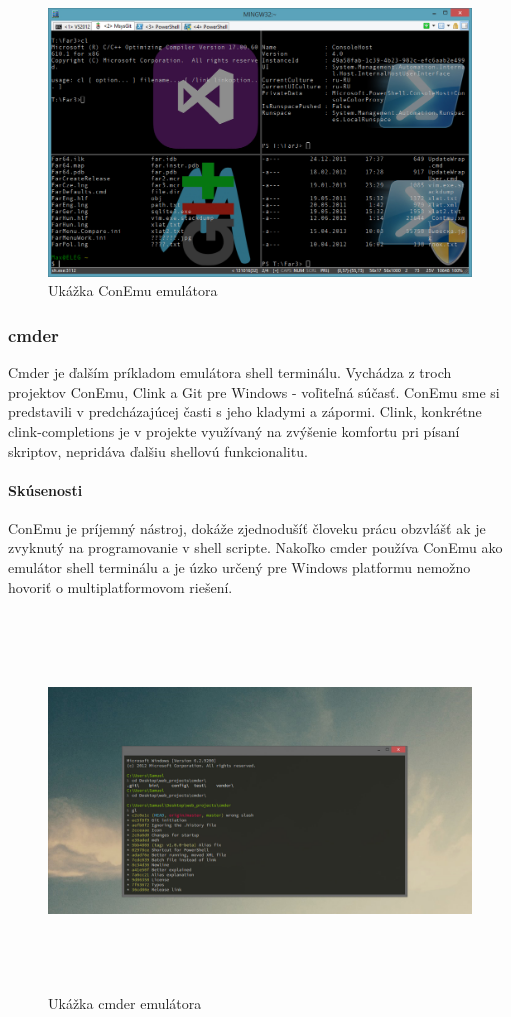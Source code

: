 \begin{figure}[!htbp]
\centering
\includegraphics[scale=0.3]{img/conEmuImg.jpg}
\caption{Ukážka ConEmu emulátora}
\label{fig:test}
\end{figure}
\newpage
\subsubsection{cmder}
\indent Cmder je ďalším príkladom emulátora shell terminálu. Vychádza z troch projektov ConEmu, Clink a Git pre Windows - voľiteľná súčasť. ConEmu sme si predstavili v predcházajúcej časti s jeho kladymi a zápormi. Clink, konkrétne clink-completions je v projekte využívaný na zvýšenie komfortu pri písaní skriptov, nepridáva ďalšiu shellovú funkcionalitu. 
\paragraph{Skúsenosti}
\indent ConEmu je príjemný nástroj, dokáže zjednodušíť človeku prácu obzvlášť ak je zvyknutý na programovanie v shell scripte. Nakoľko cmder používa ConEmu ako emulátor shell terminálu a je úzko určený pre Windows platformu nemožno hovoriť o multiplatformovom riešení.
\begin{figure}[!htbp]
	\centering
	\includegraphics[height=10cm]{img/cmder.jpg}
	\caption{Ukážka cmder emulátora}
	\label{fig:test}
\end{figure}
